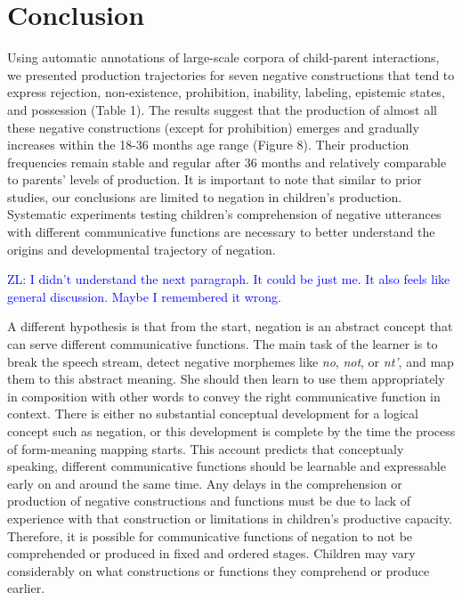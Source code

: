 \documentclass[
  english,
  man,floatsintext]{apa6}
\begin{document}
\hypertarget{conclusion}{%
\section{Conclusion}\label{conclusion}}

Using automatic annotations of large-scale corpora of child-parent interactions, we presented production trajectories for seven negative constructions that tend to express rejection, non-existence, prohibition, inability, labeling, epistemic states, and possession (Table 1). The results suggest that the production of almost all these negative constructions (except for prohibition) emerges and gradually increases within the 18-36 months age range (Figure 8). Their production frequencies remain stable and regular after 36 months and relatively comparable to parents' levels of production. It is important to note that similar to prior studies, our conclusions are limited to negation in children's production. Systematic experiments testing children's comprehension of negative utterances with different communicative functions are necessary to better understand the origins and developmental trajectory of negation.

\textcolor{blue}{ZL: I didn't understand the next paragraph. It could be just me. It also feels like general discussion. Maybe I remembered it wrong.}

A different hypothesis is that from the start, negation is an abstract concept that can serve different communicative functions. The main task of the learner is to break the speech stream, detect negative morphemes like \emph{no}, \emph{not}, or \emph{nt'}, and map them to this abstract meaning. She should then learn to use them appropriately in composition with other words to convey the right communicative function in context. There is either no substantial conceptual development for a logical concept such as negation, or this development is complete by the time the process of form-meaning mapping starts. This account predicts that conceptualy speaking, different communicative functions should be learnable and expressable early on and around the same time. Any delays in the comprehension or production of negative constructions and functions must be due to lack of experience with that construction or limitations in children's productive capacity. Therefore, it is possible for communicative functions of negation to not be comprehended or produced in fixed and ordered stages. Children may vary considerably on what constructions or functions they comprehend or produce earlier.
\end{document}
